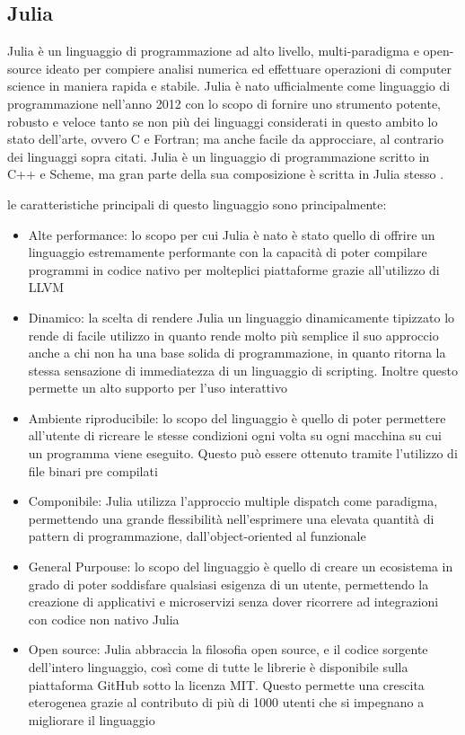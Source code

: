 \subsection{Julia}

Julia è un linguaggio di programmazione ad alto livello, 
multi-paradigma e open-source ideato per compiere analisi 
numerica ed effettuare operazioni di computer science in 
maniera rapida e stabile. Julia è nato ufficialmente come 
linguaggio di programmazione nell’anno 2012 con lo scopo di 
fornire uno strumento potente, robusto e veloce tanto se non 
più dei linguaggi considerati in questo ambito lo stato 
dell’arte, ovvero C e Fortran;  ma anche facile da approcciare, 
al contrario dei linguaggi sopra citati. Julia è un linguaggio 
di programmazione scritto in C++ e Scheme, ma gran parte della 
sua composizione è scritta in Julia stesso 
\cite{wiki:Julia_(programming_language)}.

le caratteristiche principali di questo linguaggio sono 
principalmente:
\begin{itemize}
    \item Alte performance: lo scopo per cui Julia è nato è 
    stato quello di offrire un linguaggio estremamente 
    performante con la capacità di poter compilare programmi 
    in codice nativo per molteplici piattaforme grazie 
    all’utilizzo di LLVM
    \item Dinamico: la scelta di rendere Julia un linguaggio 
    dinamicamente tipizzato lo rende di facile utilizzo in 
    quanto rende molto più semplice il suo approccio anche a 
    chi non ha una base solida di programmazione, in quanto 
    ritorna la stessa sensazione di immediatezza di un 
    linguaggio di scripting. Inoltre questo permette un alto 
    supporto per l’uso interattivo
    \item Ambiente riproducibile: lo scopo del linguaggio è 
    quello di poter permettere all’utente di ricreare le 
    stesse condizioni ogni volta su ogni macchina su cui un 
    programma viene eseguito. Questo può essere ottenuto 
    tramite l’utilizzo di file binari pre compilati
    \item Componibile: Julia utilizza l’approccio multiple 
    dispatch come paradigma, permettendo una grande 
    flessibilità nell’esprimere una elevata quantità di 
    pattern di programmazione, dall’object-oriented al 
    funzionale
    \item General Purpouse: lo scopo del linguaggio è quello 
    di creare un ecosistema in grado di poter soddisfare 
    qualsiasi esigenza di un utente, permettendo la creazione 
    di applicativi e microservizi senza dover ricorrere ad 
    integrazioni con codice non nativo Julia
    \item Open source: Julia abbraccia la filosofia open source, 
    e il codice sorgente dell’intero linguaggio, così come di 
    tutte le librerie è disponibile sulla piattaforma GitHub 
    sotto la licenza MIT. Questo permette una crescita 
    eterogenea grazie al contributo di più di 1000 utenti 
    che si impegnano a migliorare il linguaggio
\end{itemize}

